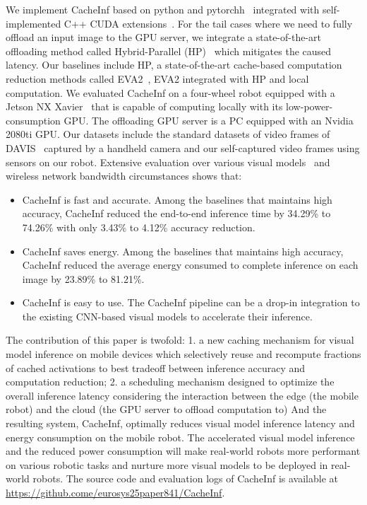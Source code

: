 We implement CacheInf based on python and pytorchh~\cite{paszke2017automatic} integrated with self-implemented C++ CUDA extensions~\cite{cuda}.
For the tail cases where we need to fully offload an input image to the GPU server, we integrate a state-of-the-art offloading method called Hybrid-Parallel (HP)~\cite{sun2024hybridparallel} which mitigates the caused latency.
Our baselines include HP, a state-of-the-art cache-based computation reduction methods called EVA2~\cite{buckler_eva_2018}, EVA2 integrated with HP and local computation.
We evaluated CacheInf on a four-wheel robot equipped with a Jetson NX Xavier~\cite{jetsonnx} that is capable of computing locally with its low-power-consumption GPU.
The offloading GPU server is a PC equipped with an Nvidia 2080ti GPU.
Our datasets include the standard datasets of video frames of DAVIS~\cite{Perazzi2016} captured by a handheld camera and our self-captured video frames using sensors on our robot.
Extensive evaluation over various visual models~\cite{kapao,agrnav,noauthor_torchvision_nodate} and wireless network bandwidth circumstances shows that:
\begin{itemize}
    \item CacheInf is fast and accurate. Among the baselines that maintains high accuracy, CacheInf reduced the end-to-end inference time by 34.29\% to 74.26\% with only 3.43\% to 4.12\% accuracy reduction.
    \item CacheInf saves energy. Among the baselines that maintains high accuracy, CacheInf reduced the average energy consumed to complete inference on each image by 23.89\% to 81.21\%.
    \item CacheInf is easy to use. The CacheInf pipeline can be a drop-in integration to the existing CNN-based visual models to accelerate their inference.
\end{itemize}

The contribution of this paper is twofold: 1. a new caching mechanism for visual model inference on mobile devices which selectively reuse and recompute fractions of cached activations to best tradeoff between inference accuracy and computation reduction; 2. a scheduling mechanism designed to optimize the overall inference latency considering the interaction between the edge (the mobile robot) and the cloud (the GPU server to offload computation to)
And the resulting system, CacheInf, optimally reduces visual model inference latency and energy consumption on the mobile robot.
The accelerated visual model inference and the reduced power consumption will make real-world robots more performant on various robotic tasks and nurture more visual models to be deployed in real-world robots.
The source code and evaluation logs of CacheInf is available at \url{https://github.come/eurosys25paper841/CacheInf}.

